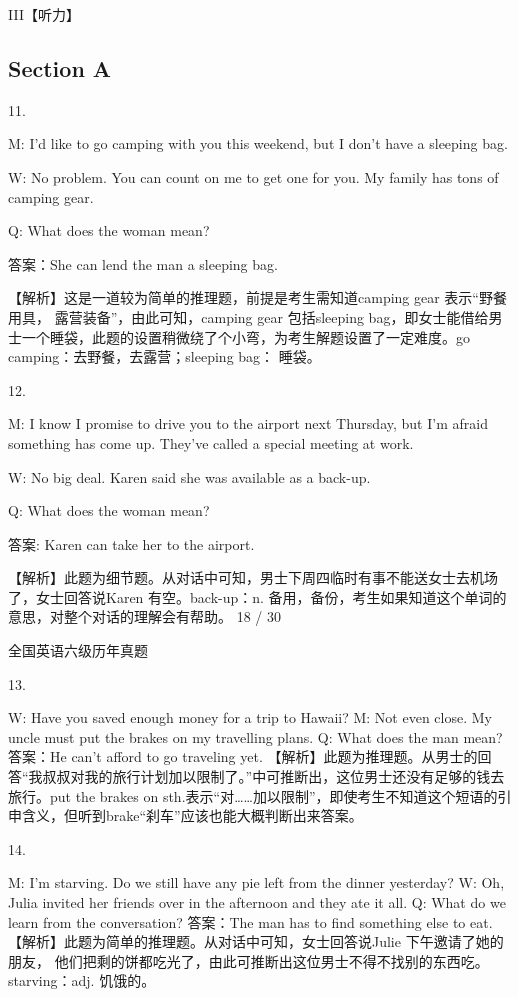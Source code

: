 \documentclass[UTF8,11pt]{ctexart}
\begin{document}
III【听力】


\subsection*{Section A}


11.


M: I’d like to go camping with you this weekend, but I don’t have a sleeping bag.


W: No problem. You can count on me to get one for you. My family has tons of camping gear.


Q: What does the woman mean?


答案：She can lend the man a sleeping bag.


【解析】这是一道较为简单的推理题，前提是考生需知道camping gear 表示“野餐用具， 露营装备”，由此可知，camping gear 包括sleeping bag，即女士能借给男士一个睡袋，此题的设置稍微绕了个小弯，为考生解题设置了一定难度。go camping：去野餐，去露营；sleeping bag： 睡袋。


12.


M: I know I promise to drive you to the airport next Thursday, but I’m afraid something has come up. They’ve called a special meeting at work.


W: No big deal. Karen said she was available as a back-up.


Q: What does the woman mean?


答案: Karen can take her to the airport.


【解析】此题为细节题。从对话中可知，男士下周四临时有事不能送女士去机场了，女士回答说Karen 有空。back-up：n. 备用，备份，考生如果知道这个单词的意思，对整个对话的理解会有帮助。 18 / 30


全国英语六级历年真题


13.


W: Have you saved enough money for a trip to Hawaii? M: Not even close. My uncle must put the brakes on my travelling plans. Q: What does the man mean? 答案：He can’t afford to go traveling yet. 【解析】此题为推理题。从男士的回答“我叔叔对我的旅行计划加以限制了。”中可推断出，这位男士还没有足够的钱去旅行。put the brakes on sth.表示“对……加以限制”，即使考生不知道这个短语的引申含义，但听到brake“刹车”应该也能大概判断出来答案。


14.


M: I’m starving. Do we still have any pie left from the dinner yesterday? W: Oh, Julia invited her friends over in the afternoon and they ate it all. Q: What do we learn from the conversation? 答案：The man has to find something else to eat. 【解析】此题为简单的推理题。从对话中可知，女士回答说Julie 下午邀请了她的朋友， 他们把剩的饼都吃光了，由此可推断出这位男士不得不找别的东西吃。starving：adj. 饥饿的。
\end{document}

